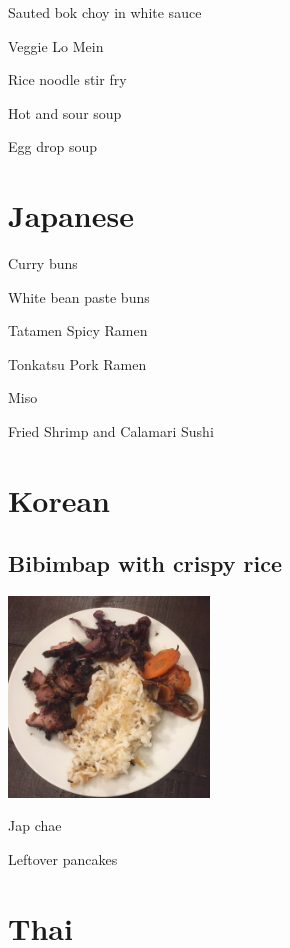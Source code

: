 \documentclass[
]{book}
\begin{document}
Sauted bok choy in white sauce

Veggie Lo Mein

Rice noodle stir fry

Hot and sour soup

Egg drop soup

\hypertarget{japanese}{%
\section*{Japanese}\label{japanese}}

Curry buns

White bean paste buns

Tatamen Spicy Ramen

Tonkatsu Pork Ramen

Miso

Fried Shrimp and Calamari Sushi

\hypertarget{korean}{%
\section*{Korean}\label{korean}}

\hypertarget{crispyrice}{%
\subsection*{Bibimbap with crispy rice}\label{crispyrice}}

\includegraphics[width=0.4\textwidth,height=\textheight]{crispy_rice_small.jpg}

Jap chae

Leftover pancakes

\hypertarget{thai}{%
\section*{Thai}\label{thai}}
\end{document}
